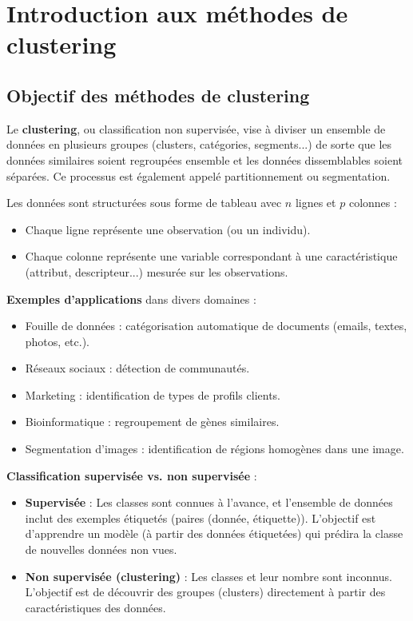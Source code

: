 \documentclass[10pt,a4paper]{article}
\title{}
\date{}
\begin{document}
\section*{Introduction aux méthodes de clustering}

\subsection*{Objectif des méthodes de clustering}

Le \textbf{clustering}, ou classification non supervisée, vise à diviser un ensemble de données en plusieurs groupes (clusters, catégories, segments...) de sorte que les données similaires soient regroupées ensemble et les données dissemblables soient séparées. Ce processus est également appelé partitionnement ou segmentation.

Les données sont structurées sous forme de tableau avec $n$ lignes et $p$ colonnes :
\begin{itemize}
    \item Chaque ligne représente une observation (ou un individu).
    \item Chaque colonne représente une variable correspondant à une caractéristique (attribut, descripteur...) mesurée sur les observations.
\end{itemize}

\textbf{Exemples d'applications} dans divers domaines :
\begin{itemize}
    \item Fouille de données : catégorisation automatique de documents (emails, textes, photos, etc.).
    \item Réseaux sociaux : détection de communautés.
    \item Marketing : identification de types de profils clients.
    \item Bioinformatique : regroupement de gènes similaires.
    \item Segmentation d'images : identification de régions homogènes dans une image.
\end{itemize}

\textbf{Classification supervisée vs. non supervisée} :
\begin{itemize}
    \item \textbf{Supervisée} : Les classes sont connues à l'avance, et l'ensemble de données inclut des exemples étiquetés (paires (donnée, étiquette)). L'objectif est d'apprendre un modèle (à partir des données étiquetées) qui prédira la classe de nouvelles données non vues.
    \item \textbf{Non supervisée (clustering)} : Les classes et leur nombre sont inconnus. L'objectif est de découvrir des groupes (clusters) directement à partir des caractéristiques des données.
\end{itemize}
\end{document}
